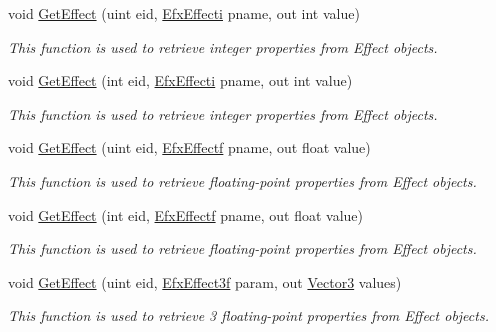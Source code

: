 \begin{DoxyCompactItemize}
void \hyperlink{class_open_t_k_1_1_audio_1_1_open_a_l_1_1_effects_extension_a9d0473c4cd888a3343093ae5e1f56add}{Get\-Effect} (uint eid, \hyperlink{namespace_open_t_k_1_1_audio_1_1_open_a_l_a49039c1ddcb53675576ad2780fc50315}{Efx\-Effecti} pname, out int value)
\begin{DoxyCompactList}\small\item\em This function is used to retrieve integer properties from Effect objects.\end{DoxyCompactList}\item 
void \hyperlink{class_open_t_k_1_1_audio_1_1_open_a_l_1_1_effects_extension_a487bd82b5def2d9e0d5810c8fa30f679}{Get\-Effect} (int eid, \hyperlink{namespace_open_t_k_1_1_audio_1_1_open_a_l_a49039c1ddcb53675576ad2780fc50315}{Efx\-Effecti} pname, out int value)
\begin{DoxyCompactList}\small\item\em This function is used to retrieve integer properties from Effect objects.\end{DoxyCompactList}\item 
void \hyperlink{class_open_t_k_1_1_audio_1_1_open_a_l_1_1_effects_extension_ac845a4e2f1dc6d042257de118cc0097a}{Get\-Effect} (uint eid, \hyperlink{namespace_open_t_k_1_1_audio_1_1_open_a_l_aa0356299908369b4365d28572c0ec20b}{Efx\-Effectf} pname, out float value)
\begin{DoxyCompactList}\small\item\em This function is used to retrieve floating-\/point properties from Effect objects.\end{DoxyCompactList}\item 
void \hyperlink{class_open_t_k_1_1_audio_1_1_open_a_l_1_1_effects_extension_a0536002e3d38c36910e3a54a21eece9d}{Get\-Effect} (int eid, \hyperlink{namespace_open_t_k_1_1_audio_1_1_open_a_l_aa0356299908369b4365d28572c0ec20b}{Efx\-Effectf} pname, out float value)
\begin{DoxyCompactList}\small\item\em This function is used to retrieve floating-\/point properties from Effect objects.\end{DoxyCompactList}\item 
void \hyperlink{class_open_t_k_1_1_audio_1_1_open_a_l_1_1_effects_extension_a7ad13f496f7ad1cd9cb18d2eef43dcc2}{Get\-Effect} (uint eid, \hyperlink{namespace_open_t_k_1_1_audio_1_1_open_a_l_a1c69083823578d237ab570da681a5cfa}{Efx\-Effect3f} param, out \hyperlink{struct_open_t_k_1_1_vector3}{Vector3} values)
\begin{DoxyCompactList}\small\item\em This function is used to retrieve 3 floating-\/point properties from Effect objects.\end{DoxyCompactList}\item 

\end{DoxyCompactItemize}
